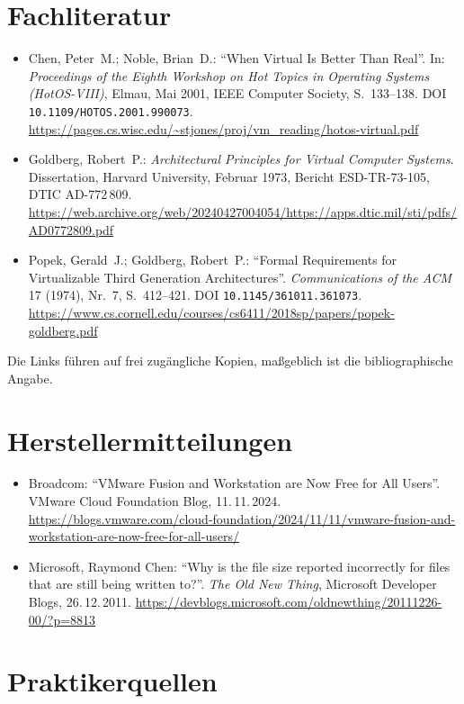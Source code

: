 \section*{Fachliteratur}

\begin{itemize}[nosep]
  \item Chen, Peter~M.; Noble, Brian~D.: \enquote{When Virtual Is Better Than Real}. In: \emph{Proceedings of the Eighth Workshop on Hot Topics in Operating Systems (HotOS-VIII)}, Elmau, Mai 2001, IEEE Computer Society, S.~133--138. DOI \nolinkurl{10.1109/HOTOS.2001.990073}. \url{https://pages.cs.wisc.edu/~stjones/proj/vm_reading/hotos-virtual.pdf}
  \item Goldberg, Robert~P.: \emph{Architectural Principles for Virtual Computer Systems}. Dissertation, Harvard University, Februar 1973, Bericht ESD-TR-73-105, DTIC AD-772\,809. \url{https://web.archive.org/web/20240427004054/https://apps.dtic.mil/sti/pdfs/AD0772809.pdf}
  \item Popek, Gerald~J.; Goldberg, Robert~P.: \enquote{Formal Requirements for Virtualizable Third Generation Architectures}. \emph{Communications of the ACM} 17 (1974), Nr.~7, S.~412--421. DOI \nolinkurl{10.1145/361011.361073}. \url{https://www.cs.cornell.edu/courses/cs6411/2018sp/papers/popek-goldberg.pdf}
\end{itemize}
Die Links führen auf frei zugängliche Kopien, maßgeblich ist die bibliographische Angabe.

\section*{Herstellermitteilungen}

\begin{itemize}[nosep]
  \item Broadcom: \enquote{VMware Fusion and Workstation are Now Free for All Users}. VMware Cloud Foundation Blog, 11.\,11.\,2024. \url{https://blogs.vmware.com/cloud-foundation/2024/11/11/vmware-fusion-and-workstation-are-now-free-for-all-users/}
  \item Microsoft, Raymond Chen: \enquote{Why is the file size reported incorrectly for files that are still being written to?}. \emph{The Old New Thing}, Microsoft Developer Blogs, 26.\,12.\,2011. \url{https://devblogs.microsoft.com/oldnewthing/20111226-00/?p=8813}
\end{itemize}

\section*{Praktikerquellen}

